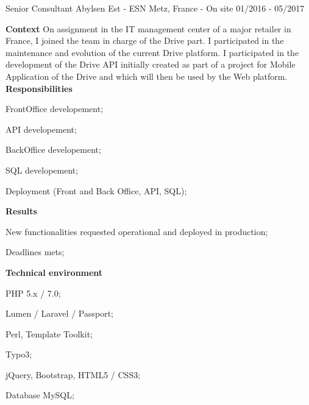 \begin{cventries}
  \cventry
    {Senior Consultant} %
    {Abylsen Est - ESN} %
    {Metz, France - On site} %
    {01/2016 - 05/2017} %
    {
      \textbf{Context}
      \newline
      On assignment in the IT management center of a major retailer in France, 
      I joined the team in charge of the Drive part. 
      \newline
      I participated in the maintenance and evolution of the current Drive platform. 
      \newline
      I participated in the development of the Drive API initially created as part 
      of a project for Mobile Application of the Drive and which will then be used 
      by the Web platform.
      \newline \vspace{2pt}
      \textbf{Responsibilities}
      \newline \vspace{12pt}
      \begin{cvitems}
        \item {FrontOffice developement;}
        \item {API developement;}
        \item {BackOffice developement;}
        \item {SQL developement;}
        \item {Deployment (Front and Back Office, API, SQL);}
      \end{cvitems}
      \textbf{Results}
      \newline \vspace{12pt}
      \begin{cvitems}
        \item {New functionalities requested operational and deployed in production;}
        \item {Deadlines mets;}
      \end{cvitems}
      \textbf{Technical environment}
      \newline \vspace{12pt}
      \begin{cvitems}
        \item {PHP 5.x / 7.0;}
        \item {Lumen / Laravel / Passport;}
        \item {Perl, Template Toolkit;}
        \item {Typo3;}
        \item {jQuery, Bootstrap, HTML5 / CSS3;}
        \item {Database MySQL;}
      \end{cvitems}
    }


\end{cventries}
